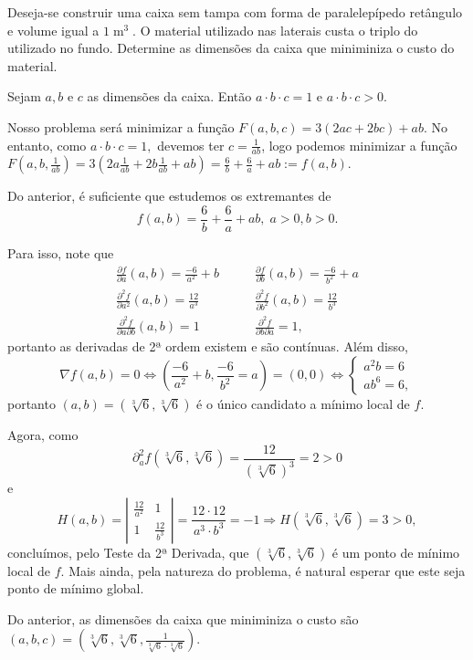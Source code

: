 \begin{example}
    
    Deseja-se construir uma caixa sem tampa com forma de paralelepípedo retângulo e volume igual a \(1\operatorname{m}^3\). O material utilizado nas laterais custa o triplo do utilizado no fundo. Determine as dimensões da caixa que miniminiza o custo do material.

    Sejam \(a, b\) e \(c\) as dimensões da caixa. Então \(a\cdot b\cdot c = 1\) e \(a\cdot b\cdot c >0\).

    Nosso problema será minimizar a função \(F(a,b,c) = 3(2ac + 2bc) + ab.\) No entanto, como \(a\cdot b\cdot c = 1,\) devemos ter \(c = \frac{1}{ab}\), logo podemos minimizar a função \(F(a,b,\frac{1}{ab}) = 3\left( 2 a \frac{1}{ab} + 2b \frac{1}{ab} + ab \right) = \frac{6}{b} + \frac{6}{a} + ab := f(a,b).\)

    Do anterior, é suficiente que estudemos os extremantes de \[f(a,b) = \frac{6}{b} + \frac{6}{a} + ab,\; a >0, b> 0.\]

    Para isso, note que
        \begin{align*}
            \frac{\partial f}{\partial a}(a,b) = \frac{-6}{a^2} + b \quad & \quad \frac{\partial f}{\partial b}(a,b) = \frac{-6}{b^2} + a \\
            \frac{\partial^2 f}{\partial a^2}(a,b) = \frac{12}{a^3} \quad & \quad \frac{\partial^2 f}{\partial b^2}(a,b) = \frac{12}{b^3} \\
            \frac{\partial^2 f}{\partial a \partial b}(a,b) = 1 \quad & \quad  \frac{\partial^2 f}{\partial b \partial a} = 1,
        \end{align*}
    portanto as derivadas de 2ª ordem existem e são contínuas. Além disso, \[\nabla f(a,b) = 0 \Leftrightarrow \left( \frac{-6}{a^2} + b, \frac{-6}{b^2} = a \right) = (0,0) \Leftrightarrow \begin{cases}
        a^2 b = 6 \\
        a b^6 = 6,
    \end{cases}\] portanto \((a,b) = (\sqrt[3]{6}, \sqrt[3]{6})\) é o único candidato a mínimo local de \(f\).

    Agora, como \[\partial^2_a f(\sqrt[3]{6},\sqrt[3]{6}) = \frac{12}{(\sqrt[3]{6})^3} = 2 > 0\] e \[H(a,b) = \left|\begin{matrix}
        \frac{12}{a^2} & 1 \\ 1 & \frac{12}{b^3}
    \end{matrix}\right| = \frac{12\cdot 12}{a^3\cdot b^3} = -1 \Rightarrow H(\sqrt[3]{6},\sqrt[3]{6}) = 3 >0,\] concluímos, pelo Teste da 2ª Derivada, que \((\sqrt[3]{6},\sqrt[3]{6})\) é um ponto de mínimo local de \(f\). Mais ainda, pela natureza do problema, é natural esperar que este seja ponto de mínimo global.

    Do anterior, as dimensões da caixa que miniminiza o custo são \((a,b,c) = (\sqrt[3]{6},\sqrt[3]{6},\frac{1}{\sqrt[3]{6}\cdot\sqrt[3]{6}})\).
\end{example}

